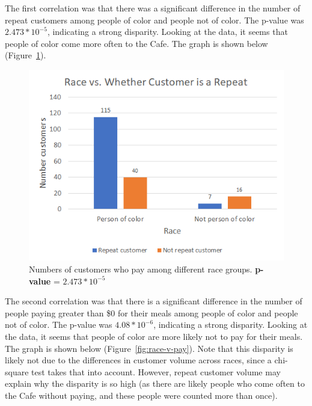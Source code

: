 The first correlation was that there was a significant difference in the number of repeat customers among people of color and people not of color. The p-value was \(2.473 * 10^{-5}\), indicating a strong disparity. Looking at the data, it seems that people of color come more often to the Cafe. The graph is shown below (Figure~\ref{fig:race-v-repeat}).

\begin{figure}[H]
    \centering \includegraphics*[scale=.5]{assets/race-v-repeat.png}
    
    \caption{Numbers of customers who pay among different race groups.
    \textbf{p-value} = \(2.473 * 10^{-5}\)}\label{fig:race-v-repeat}
\end{figure}

The second correlation was that there is a significant difference in the number of people paying greater than \$0 for their meals among people of color and people not of color. The p-value was \(4.08 * 10^{-6}\), indicating a strong disparity. Looking at the data, it seems that people of color are more likely not to pay for their meals. The graph is shown below (Figure~\ref{fig:race-v-pay}). Note that this disparity is likely not due to the differences in customer volume across races, since a chi-square test takes that into account. However, repeat customer volume may explain why the disparity is so high (as there are likely people who come often to the Cafe without paying, and these people were counted more than once).

